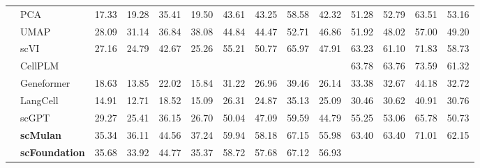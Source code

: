 \begin{table}[htbp]
\begin{tabular}{llcccccccccccc}
      & PCA      &   17.33 &   19.28 &   35.41 &   19.50 &   43.61 &   43.25 &   58.58 &   42.32 &   51.28 &   52.79 &   63.51 &   53.16  \\
      & UMAP      &   28.09 &   31.14 &   36.84 &   38.08 &   44.84 &   44.47 &   52.71 &   46.86 &   51.92 &   48.02 &   57.00 &   49.20  \\
      & scVI      &   27.16 &   24.79 &   42.67 &   25.26 &   55.21 &   50.77 &   65.97 &   47.91 &   63.23 &   61.10 &   71.83 &   58.73  \\
      & CellPLM      & \cellcolor{gray!25}{45.90} & \cellcolor{gray!25}{42.89} & \cellcolor{gray!25}{53.14} & \cellcolor{gray!25}{43.12} & \cellcolor{gray!25}{60.17} & \cellcolor{gray!25}{59.59} & \cellcolor{gray!25}{69.68} & \cellcolor{gray!25}{57.53} &   63.78 &   63.76 &   73.59 &   61.32  \\
      & Geneformer      &   18.63 &   13.85 &   22.02 &   15.84 &   31.22 &   26.96 &   39.46 &   26.14 &   33.38 &   32.67 &   44.18 &   32.72  \\
      & LangCell      &   14.91 &   12.71 &   18.52 &   15.09 &   26.31 &   24.87 &   35.13 &   25.09 &   30.46 &   30.62 &   40.91 &   30.76  \\
      & scGPT      &   29.27 &   25.41 &   36.15 &   26.70 &   50.04 &   47.09 &   59.59 &   44.79 &   55.25 &   53.06 &   65.78 &   50.73  \\
      & \cellcolor{gray!25}\textbf{scMulan}      &   35.34 &   36.11 &   44.56 &   37.24 &   59.94 &   58.18 &   67.15 &   55.98 &   63.40 &   63.40 &   71.01 &   62.15  \\
      & \cellcolor{gray!25}\textbf{scFoundation}      &   35.68 &   33.92 &   44.77 &   35.37 &   58.72 &   57.68 &   67.12 &   56.93 & \cellcolor{gray!25}{66.52} & \cellcolor{gray!25}{65.46} & \cellcolor{gray!25}{73.62} & \cellcolor{gray!25}{63.41}  \\
    \midrule

    \bottomrule
  \end{tabular}
\end{table}